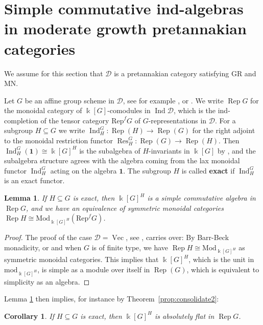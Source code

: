 \documentclass[11pt]{amsart}
\def\Ind{\operatorname{Ind}}
\def\Ds{\mathscr{D}}
\def\bk{\Bbbk}
\def\mod{\mathrm{ mod}}
\def\Rep{\operatorname{Rep}}
\def\Vec{\operatorname{Vec}}
\def\Mod{\mathrm{Mod}}
\def\sub{\subseteq}
\newtheorem{cor}[thm]{Corollary}
\newtheorem{lemma}[thm]{Lemma}
\theoremstyle{definition}
\theoremstyle{remark}
\numberwithin{equation}{section}
\newcommand{\unit}{\mathbf{1}}
\begin{document}


\section{Simple commutative ind-algebras in moderate growth pretannakian categories}\label{sec:simpleGRMN}
We assume for this section that $\Ds$ is a pretannakian category satisfying GR and MN.


\medskip

Let $G$ be an affine group scheme in $\Ds$, see for example \cite[\S 7]{C1}, \cite{BP} or \cite[\S 3]{CS}. We write $\Rep G$ for the monoidal category of $\bk[G]$-comodules in $\Ind\Ds$, which is the ind-completion of the tensor category $\mathrm{Rep}^f G$ of $G$-representations in $\Ds$.  For a subgroup $H\subseteq G$ we write $\operatorname{Ind}_{H}^{G}:\Rep(H)\to\Rep(G)$ for the right adjoint to the monoidal restriction functor $\operatorname{Res}^G_H:\Rep(G)\to\Rep(H)$.  Then $\operatorname{Ind}_H^{G}(\mathbf{1})\cong \bk[G]^H$ is the subalgebra of $H$-invariants in $\bk[G]$ by \cite[Lem.~7.13]{CS}, and the subalgebra structure agrees with the algebra coming from the lax monoidal functor $\Ind^G_H$ acting on the algebra $\unit$. The subgroup $H$ is called {\bf exact} if $\operatorname{Ind}_H^{G}$ is an exact functor.  

\begin{lemma}\label{lemma induced from exact is simple}
    If $H\sub G$ is exact, then $\Bbbk[G]^H$ is a simple commutative algebra in $\Rep G$, and we have an equivalence of symmetric monoidal categories $\Rep H\cong\Mod_{\Bbbk[G]^H}(\mathrm{Rep}^fG)$.  
\end{lemma}

\begin{proof}The proof of the case $\Ds=\Vec$, see \cite[Theorem~6.1.5(1)]{CEO}, carries over:
    By Barr-Beck monadicity, or \cite[Prop.~7.12]{CS} and \cite[Thm.~7.3.2]{C2} when $G$ is of finite type, we have $\Rep H\cong\Mod_{\Bbbk[G]^H}$ as symmetric monoidal categories.  This implies that $\Bbbk[G]^H$, which is the unit in $\mod_{\Bbbk[G]^H}$, is simple as a module over itself in $\Rep(G)$, which is equivalent to simplicity as an algebra. 
\end{proof}
Lemma \ref{lemma induced from exact is simple} then implies, for instance by Theorem~\ref{prop:consolidate2}:
\begin{cor}\label{cor exact is flat}
    If $H\sub G$ is exact, then $\Bbbk[G]^H$ is absolutely flat in $\Rep G$.
\end{cor}
\end{document}
